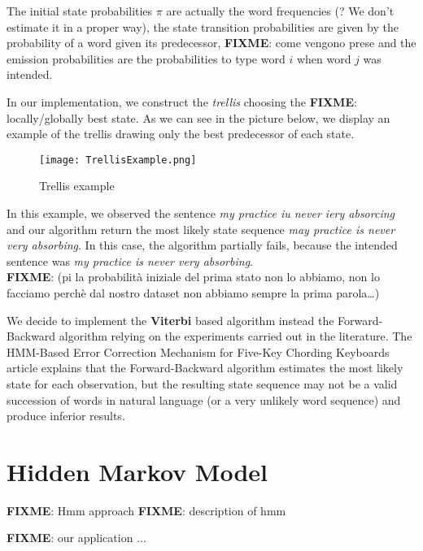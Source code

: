 The initial state probabilities $\pi$ are actually the word frequencies (? We don’t estimate it in a proper way), the state 
transition probabilities are given by the probability of a word given its predecessor, \textbf{FIXME}: {come vengono prese} 
and the emission probabilities are the probabilities to type word $i$ when word $j$ was intended.

In our implementation, we construct the \textit{trellis} choosing the \textbf{FIXME}: {locally/globally} best state. As we can 
see in the 
picture below, we display an example of the trellis drawing only the best predecessor of each state.

\begin{figure}[H]
	\centering
	\texttt{[image: TrellisExample.png]}
	\caption{Trellis example}
	\label{fig:trellis}
\end{figure}

In this example, we observed the sentence \textsl{my practice iu never iery absorcing} and our algorithm return the most 
likely state sequence \textsl{may practice is never very absorbing}. In this case, the algorithm partially fails, because the 
intended sentence was \textsl{my practice is never very absorbing}.
\\
\textbf{FIXME}: (pi la probabilità iniziale del prima stato non lo abbiamo, non lo facciamo perchè dal nostro dataset non 
abbiamo sempre la prima parola…)

We decide to implement the \textbf{Viterbi} based algorithm instead the Forward-Backward algorithm relying on the 
experiments carried out in the literature.
The HMM-Based Error Correction Mechanism for Five-Key Chording Keyboards article \cite{tarniceriu2015hmm} explains 
that the Forward-Backward algorithm estimates the most likely state for each observation, but the resulting state 
sequence may not be a valid succession of words in natural language (or a very unlikely word sequence) and produce 
inferior results.


\section{Hidden Markov Model}


\textbf{FIXME}: Hmm approach
\textbf{FIXME}: description of hmm

\textbf{FIXME}: our application ...